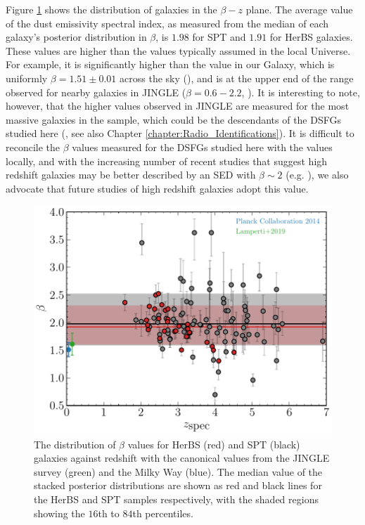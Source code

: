 Figure \ref{fig:beta_z_evolution} shows the distribution of galaxies in the $\beta-z$ plane. The average value of the dust emissivity spectral index, as measured from the median of each galaxy's posterior distribution in $\beta$, is $1.98$ for SPT and $1.91$ for HerBS galaxies. These values are higher than the values typically assumed in the local Universe. For example, it is significantly higher than the value in our Galaxy, which is uniformly $\beta = 1.51\pm0.01$ across the sky (\citealt{Planck_Collaboration_2015}), and is at the upper end of the range observed for nearby galaxies in JINGLE ($\beta = 0.6 - 2.2$, \citealt{Lamperti_2019}). It is interesting to note, however, that the higher values observed in JINGLE are measured for the most massive galaxies in the sample, which could be the descendants of the DSFGs studied here (\citealt{Eales_2023}, see also Chapter \ref{chapter:Radio_Identifications}). It is difficult to reconcile the $\beta$ values measured for the DSFGs studied here with the values locally, and with the increasing number of recent studies that suggest high redshift galaxies may be better described by an SED with $\beta \sim 2$ (e.g. \citealt{daCunha_2021, Witstok_2023}), we also advocate that future studies of high redshift galaxies adopt this value.

\begin{figure}
	\centering
	\includegraphics[width=0.76\columnwidth]{Figures/Figure_4_9.pdf}
	\caption[Distribution of HerBS and SPT galaxies in the $\beta$ - redshift plane]{The distribution of $\beta$ values for HerBS (red) and SPT (black) galaxies against redshift with the canonical values from the JINGLE survey (green) and the Milky Way (blue). The median value of the stacked posterior distributions are shown as red and black lines for the HerBS and SPT samples respectively, with the shaded regions showing the $16$th to $84$th percentiles.}
	\label{fig:beta_z_evolution}
\end{figure}

